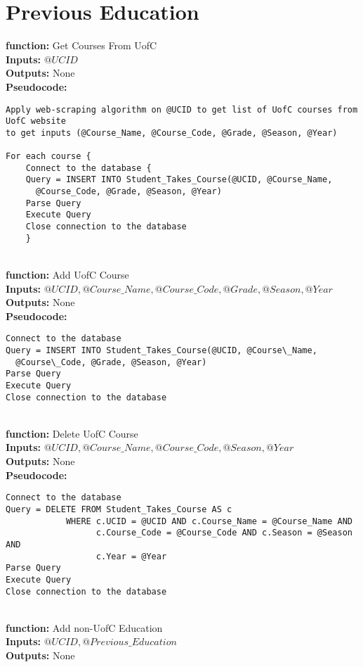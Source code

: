 \documentclass[11pt]{article} %
\begin{document}
\section{Previous Education}
\textbf{function:} Get Courses From UofC\\
\textbf{Inputs:} $@UCID$\\
\textbf{Outputs:} None\\
\textbf{Pseudocode:} 
\begin{verbatim}
Apply web-scraping algorithm on @UCID to get list of UofC courses from UofC website
to get inputs (@Course_Name, @Course_Code, @Grade, @Season, @Year)

For each course {
    Connect to the database {
    Query = INSERT INTO Student_Takes_Course(@UCID, @Course_Name, 
      @Course_Code, @Grade, @Season, @Year)
    Parse Query
    Execute Query
    Close connection to the database
    }
\end{verbatim} \\
\textbf{function:} Add UofC Course\\
\textbf{Inputs:} $@UCID, @Course\_Name, @Course\_Code, @Grade, @Season, @Year$\\
\textbf{Outputs:} None\\
\textbf{Pseudocode:} 
\begin{verbatim}
Connect to the database
Query = INSERT INTO Student_Takes_Course(@UCID, @Course\_Name, 
  @Course\_Code, @Grade, @Season, @Year)
Parse Query
Execute Query
Close connection to the database
\end{verbatim} \\
\textbf{function:} Delete UofC Course\\
\textbf{Inputs:} $@UCID, @Course\_Name, @Course\_Code, @Season, @Year$\\
\textbf{Outputs:} None\\
\textbf{Pseudocode:} 
\begin{verbatim}
Connect to the database
Query = DELETE FROM Student_Takes_Course AS c
            WHERE c.UCID = @UCID AND c.Course_Name = @Course_Name AND 
                  c.Course_Code = @Course_Code AND c.Season = @Season AND 
                  c.Year = @Year
Parse Query
Execute Query
Close connection to the database
\end{verbatim} \\
\textbf{function:} Add non-UofC Education\\
\textbf{Inputs:} $@UCID, @Previous\_Education$\\
\textbf{Outputs:} None\\
\end{document}
